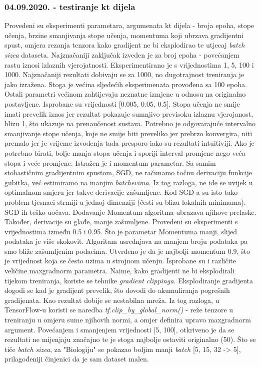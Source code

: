 \subsubsection{04.09.2020. - testiranje kt dijela}
Provedeni su eksperimenti parametara, argumenata kt dijela - broja epoha, stope učenja, brzine smanjivanja stope učenja, momentuma koji ubrzava gradijentni spust, omjera rezanja tenzora kako gradijent ne bi eksplodirao te utjecaj \textit{batch sizea} dataseta.\newline
Najznačaniji zaključak izveden je za broj epoha - povećanjem rastu iznosi izlaznih vjerojatnosti. Eksperimentirano je s vrijednostima 1, 5, 100 i 1000. Najznačaniji rezultati dobivaju se za 1000, no dugotrajnost treniranja je jako izražena. Stoga je većina sljedećih eksperimenata provođena sa 100 epoha. Ostali parametri većinom zahtijevaju neznatne izmjene u odnosu na originalno postavljene.\newline
Isprobane su vrijednosti [0.005, 0.05, 0.5]. Stopa učenja ne smije imati prevelik iznos jer rezultat pokazuje sumnjivo previsoku izlaznu vjerojanost, blizu 1, što ukazuje na prenaučenost sustava. Potrebno je odgovarajuće intervalno smanjivanje stope učenja, koje ne smije biti preveliko jer prebrzo konvergira, niti premalo jer je vrijeme izvođenja tada presporo iako su rezultati intuitiviji. Ako je potrebno birati, bolje manja stopa učenja i sporiji interval promjene nego veća stopa i veće promjene.\newline
Istražen je i momentum parametar. Sa samim stohastičnim gradijentnim spustom, SGD, ne računamo točnu derivaciju funkcije gubitka, već estimiramo na manjim \textit{batchevima}. Iz tog razloga, ne ide se uvijek u optimalnom smjeru jer takve derivacije zašumljene. Kod SGD-a su isto tako problem tjesnaci strmiji u jednoj dimenziji (česti su blizu lokalnih minimuma). SGD ih teško uočava. Dodavanje Momentum algoritma ubrazava njihove prelaske. Također, derivacije su glađe, manje zašumljene. Provedeni su eksperimenti s vrijednostima između 0.5 i 0.95. Što je parametar Momentuma manji, slijed podataka je više skokovit. Algoritam usrednjava na manjem broju podataka pa smo bliže zašumljenim podacima. Utvrđeno je da je najbolji momentum 0.9, što je vrijednost koja se često uzima u strojnom učenju.\newline
Isprobane su i različite veličine maxgradnorm parametra. Naime, kako gradijenti ne bi eksplodirali tijekom treniranja, koriste se tehnike \textit{gradient clippinga}. Eksplodiranje gradijenta dogodi se kad je gradijent prevelik, što dovodi do akumuliranja pogrešnih gradijenata. Kao rezultat dobije se nestabilna mreža. Iz tog razloga, u TensorFlow-u koristi se naredba \textit{tf.clip\_by\_global\_norm()} - reže tenzore u treniranju u omjeru sume njihovih normi, a omjer definira upravo maxgradnorm argument. Povećanjem i smanjenjem vrijednosti [5, 100], otkriveno je da se rezultati ne mijenjaju značajno te je stoga najbolje ostaviti originalno (50). \newline
Što se tiče \textit{batch sizea}, za "Biologiju" se pokazao boljim manji \textit{batch} [5, 15, 32 -> 5], prilagođeniji činjenici da je sam dataset malen. 

